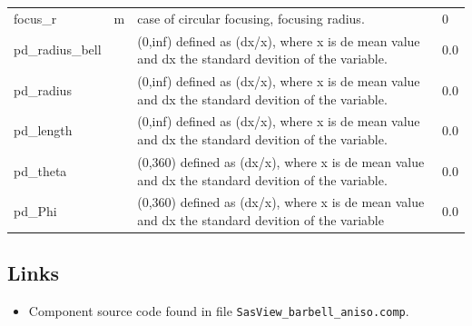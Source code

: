 \begin{longtable}{p{}p{}p{}p{}}
focus\_r & m & case of circular focusing, focusing radius. & 0 \\
pd\_radius\_bell &  & (0,inf) defined as (dx/x), where x is de mean value and dx the standard devition of the variable. & 0.0 \\
pd\_radius &  & (0,inf) defined as (dx/x), where x is de mean value and dx the standard devition of the variable. & 0.0 \\
pd\_length &  & (0,inf) defined as (dx/x), where x is de mean value and dx the standard devition of the variable. & 0.0 \\
pd\_theta &  & (0,360) defined as (dx/x), where x is de mean value and dx the standard devition of the variable. & 0.0 \\
pd\_Phi &  & (0,360) defined as (dx/x), where x is de mean value and dx the standard devition of the variable & 0.0 \\
\bottomrule
\end{longtable}

\subsection*{Links}
\begin{itemize}
  \item Component source code found in file \texttt{SasView\_barbell\_aniso.comp}.
\end{itemize}
